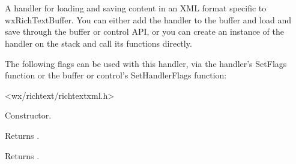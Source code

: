 \section{}\label{wxrichtextxmlhandler}

A handler for loading and saving content in an XML format specific
to wxRichTextBuffer. You can either add the handler to the buffer
and load and save through the buffer or control API, or you can
create an instance of the handler on the stack and call its
functions directly.


The following flags can be used with this handler, via
the handler's SetFlags function or the buffer or control's
SetHandlerFlags function:

\twocolwidtha{7cm}
\begin{twocollist}\itemsep=0pt
\end{twocollist}




<wx/richtext/richtextxml.h>



\label{wxrichtextxmlhandlerwxrichtextxmlhandler}


Constructor.

\label{wxrichtextxmlhandlercanload}


Returns \true.

\label{wxrichtextxmlhandlercansave}


Returns \true.

\label{wxrichtextxmlhandlercreatestyle}

